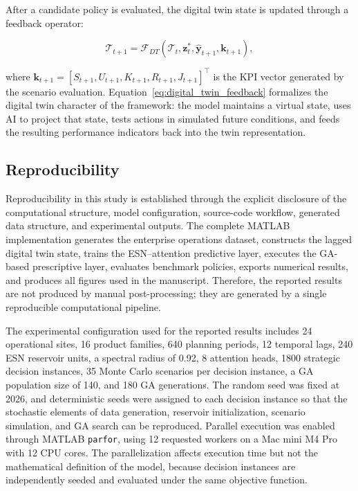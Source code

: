 \documentclass[apajournal,article,submit,pdftex,moreauthors]{Definitions/mdpi}
\begin{document}
After a candidate policy is evaluated, the digital twin state is updated through a feedback operator:

\begin{linenomath}
\begin{equation}
\mathcal{T}_{t+1}
=
\mathcal{F}_{DT}
\left(
\mathcal{T}_{t},
\mathbf{z}_{t}^{*},
\widehat{\mathbf{y}}_{t+1},
\mathbf{k}_{t+1}
\right),
\label{eq:digital_twin_feedback}
\end{equation}
\end{linenomath}
where $\mathbf{k}_{t+1}=[S_{t+1},U_{t+1},K_{t+1},R_{t+1},J_{t+1}]^{\top}$ is the KPI vector generated by the scenario evaluation. Equation~\eqref{eq:digital_twin_feedback} formalizes the digital twin character of the framework: the model maintains a virtual state, uses AI to project that state, tests actions in simulated future conditions, and feeds the resulting performance indicators back into the twin representation.

\subsection{Reproducibility}
Reproducibility in this study is established through the explicit disclosure of the computational structure, model configuration, source-code workflow, generated data structure, and experimental outputs. The complete MATLAB implementation generates the enterprise operations dataset, constructs the lagged digital twin state, trains the ESN--attention predictive layer, executes the GA-based prescriptive layer, evaluates benchmark policies, exports numerical results, and produces all figures used in the manuscript. Therefore, the reported results are not produced by manual post-processing; they are generated by a single reproducible computational pipeline.

The experimental configuration used for the reported results includes 24 operational sites, 16 product families, 640 planning periods, 12 temporal lags, 240 ESN reservoir units, a spectral radius of 0.92, 8 attention heads, 1800 strategic decision instances, 35 Monte Carlo scenarios per decision instance, a GA population size of 140, and 180 GA generations. The random seed was fixed at 2026, and deterministic seeds were assigned to each decision instance so that the stochastic elements of data generation, reservoir initialization, scenario simulation, and GA search can be reproduced. Parallel execution was enabled through MATLAB \texttt{parfor}, using 12 requested workers on a Mac mini M4 Pro with 12 CPU cores. The parallelization affects execution time but not the mathematical definition of the model, because decision instances are independently seeded and evaluated under the same objective function.
\end{document}
